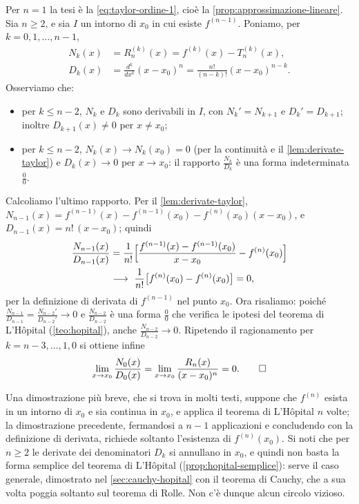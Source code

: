 \begin{dimostrazione}
Per $n=1$ la tesi è la \eqref{eq:taylor-ordine-1}, cioè la
\cref{prop:approssimazione-lineare}. Sia $n\ge2$, e sia $I$ un intorno di $x_{0}$ in cui
esiste $f^{(n-1)}$. Poniamo, per $k=0,1,\dots,n-1$,
\begin{align*}
  N_{k}(x)&=R_{n}^{(k)}(x)=f^{(k)}(x)-T_{n}^{(k)}(x),\\
  D_{k}(x)&=\frac{d^{k}}{dx^{k}}(x-x_{0})^{n}=\frac{n!}{(n-k)!}(x-x_{0})^{n-k} .
\end{align*}
Osserviamo che:
\begin{itemize}
  \item per $k\le n-2$, $N_{k}$ e $D_{k}$ sono derivabili in $I$, con $N_{k}'=N_{k+1}$ e
  $D_{k}'=D_{k+1}$; inoltre $D_{k+1}(x)\neq0$ per $x\neq x_{0}$;
  \item per $k\le n-2$, $N_{k}(x)\to N_{k}(x_{0})=0$ (per la continuità e il
  \cref{lem:derivate-taylor}) e $D_{k}(x)\to0$ per $x\to x_{0}$: il rapporto
  $\frac{N_{k}}{D_{k}}$ è una forma indeterminata $\frac00$.
\end{itemize}
Calcoliamo l'ultimo rapporto. Per il \cref{lem:derivate-taylor},
$N_{n-1}(x)=f^{(n-1)}(x)-f^{(n-1)}(x_{0})-f^{(n)}(x_{0})(x-x_{0})$, e $D_{n-1}(x)=n!\,(x-x_{0})$;
quindi
\begin{equation}\label{eq:taylor-ultimo}
\begin{split}
  \frac{N_{n-1}(x)}{D_{n-1}(x)}&=\frac1{n!}\Bigl[\frac{f^{(n-1)}(x)-f^{(n-1)}(x_{0})}{x-x_{0}}
  -f^{(n)}(x_{0})\Bigr]\\
  &\longrightarrow\ \frac1{n!}\bigl[f^{(n)}(x_{0})-f^{(n)}(x_{0})\bigr]=0,
\end{split}
\end{equation}
per la definizione di derivata di $f^{(n-1)}$ nel punto $x_{0}$. Ora risaliamo: poiché
$\frac{N_{n-1}}{D_{n-1}}=\frac{N_{n-2}'}{D_{n-2}'}\to0$ e $\frac{N_{n-2}}{D_{n-2}}$ è una
forma $\frac00$ che verifica le ipotesi del teorema di L'Hôpital (\cref{teo:hopital}),
anche $\frac{N_{n-2}}{D_{n-2}}\to0$. Ripetendo il ragionamento per
$k=n-3,\dots,1,0$ si ottiene infine
\[
  \lim_{x\to x_{0}}\frac{N_{0}(x)}{D_{0}(x)}=\lim_{x\to x_{0}}\frac{R_{n}(x)}{(x-x_{0})^{n}}=0 .
  \qedhere
\]
\end{dimostrazione}

\begin{osservazione}
\label{oss:taylor-ipotesi}
Una dimostrazione più breve, che si trova in molti testi, suppone che $f^{(n)}$ esista in
un intorno di $x_{0}$ e sia continua in $x_{0}$, e applica il teorema di L'Hôpital $n$
volte; la dimostrazione precedente, fermandosi a $n-1$ applicazioni e concludendo con la
definizione di derivata, richiede soltanto l'esistenza di $f^{(n)}(x_{0})$. Si noti che
per $n\ge2$ le derivate dei denominatori $D_{k}$ si annullano in $x_{0}$, e quindi non
basta la forma semplice del teorema di L'Hôpital (\cref{prop:hopital-semplice}): serve
il caso generale, dimostrato nel \cref{sec:cauchy-hopital} con il teorema di Cauchy, che
a sua volta poggia soltanto sul teorema di Rolle. Non c'è dunque alcun circolo vizioso.
\end{osservazione}

